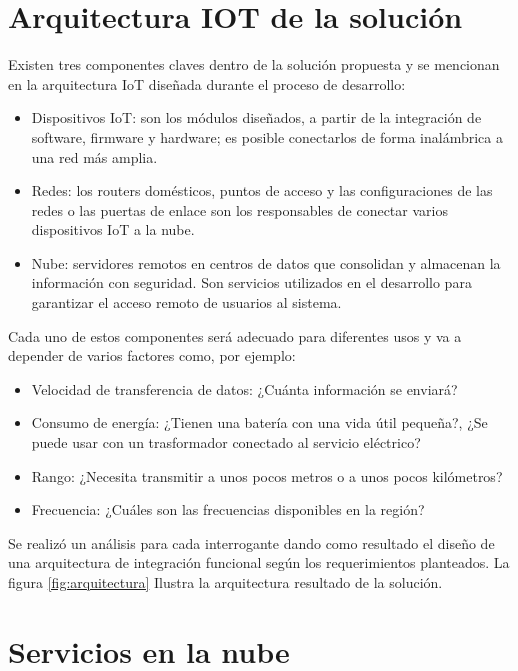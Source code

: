 \section{Arquitectura IOT de la solución}

Existen tres componentes claves dentro de la solución propuesta y se mencionan en la arquitectura IoT diseñada durante el proceso de desarrollo: 


\begin{itemize}
\item Dispositivos IoT: son los módulos diseñados, a partir de la integración de software, firmware y hardware; es posible conectarlos de forma inalámbrica a una red más amplia.
\item Redes: los routers domésticos, puntos de acceso y las configuraciones de las redes o las puertas de enlace son los responsables de conectar varios dispositivos IoT a la nube.
\item Nube: servidores remotos en centros de datos que consolidan y almacenan la información con seguridad. Son servicios utilizados en el desarrollo para garantizar el acceso remoto de usuarios al sistema.
\end{itemize}
\vspace{0.5cm}
Cada uno de estos componentes será adecuado para diferentes usos y va a depender de varios factores como, por ejemplo:

\begin{itemize}
\item Velocidad de transferencia de datos: ¿Cuánta información se enviará?
\item Consumo de energía: ¿Tienen una batería con una vida útil pequeña?, ¿Se puede usar con un trasformador conectado al servicio eléctrico?
\item Rango: ¿Necesita transmitir a unos pocos metros o a unos pocos kilómetros?
\item Frecuencia: ¿Cuáles son las frecuencias disponibles en la región?
\end{itemize}

\vspace{0.5cm}

Se realizó un análisis para cada interrogante dando como resultado el diseño de una arquitectura de integración funcional según los requerimientos  planteados. La figura \ref{fig:arquitectura} Ilustra la arquitectura resultado de la solución.

\section{Servicios en la nube}

